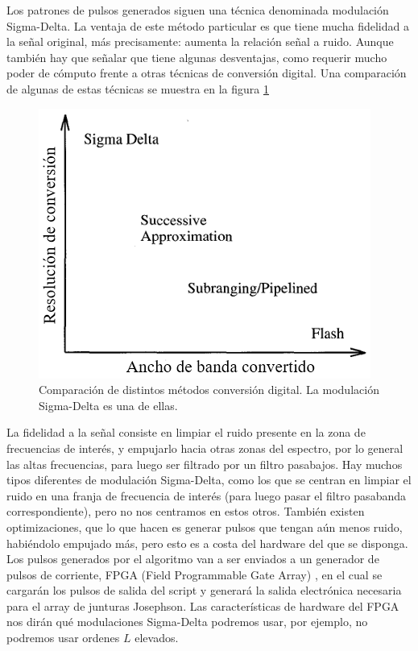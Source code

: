 \documentclass[twoside]{article}
\begin{document}
\begin{multicols}{2}
Los patrones de pulsos generados siguen una técnica denominada modulación Sigma-Delta. La ventaja de este método particular es que tiene mucha fidelidad a la señal original, más precisamente: aumenta la relación señal a ruido. Aunque también hay que señalar que tiene algunas desventajas, como requerir mucho poder de cómputo frente a otras técnicas de conversión digital. Una comparación de algunas de estas técnicas se muestra en la figura \ref{fig:tecnicas}

\begin{figure}[H]
\centering
\includegraphics[width=0.75\linewidth]{figuras/fig3aziz.png}
\caption{Comparación de distintos métodos conversión digital. La modulación Sigma-Delta es una de ellas.}
\label{fig:tecnicas}
\end{figure}

La fidelidad a la señal consiste en limpiar el ruido presente en la zona de frecuencias de interés, y empujarlo hacia otras zonas del espectro, por lo general las altas frecuencias, para luego ser filtrado por un filtro pasabajos. Hay muchos tipos diferentes de modulación Sigma-Delta, como los que se centran en limpiar el ruido en una franja de frecuencia de interés (para luego pasar el filtro pasabanda correspondiente), pero no nos centramos en estos otros.
También existen optimizaciones, que lo que hacen es generar pulsos que tengan aún menos ruido, habiéndolo empujado más, pero esto es a costa del hardware del que se disponga.
Los pulsos generados por el algoritmo van a ser enviados a un generador de pulsos de corriente, FPGA (Field Programmable Gate Array) \cite{fpga}, en el cual se cargarán los pulsos de salida del script y generará la salida electrónica necesaria para el array de junturas Josephson. Las características de hardware del FPGA nos dirán qué modulaciones Sigma-Delta podremos usar, por ejemplo, no podremos usar ordenes $L$ elevados.




\end{multicols}
\end{document}
